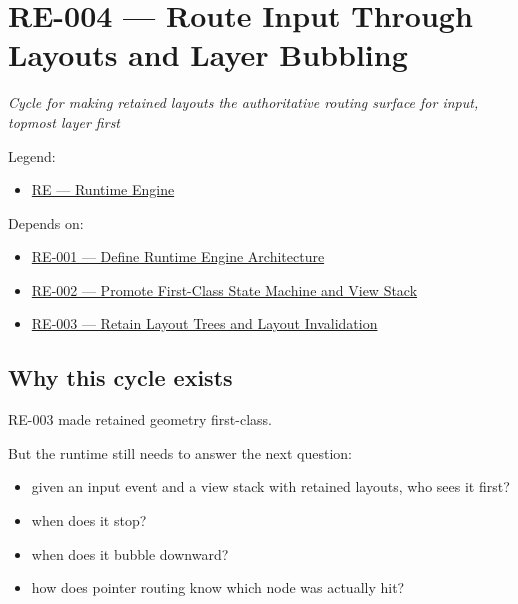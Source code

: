 \chapter{RE-004 --- Route Input Through Layouts and Layer Bubbling}\label{record-152}

\smallskip

\emph{Cycle for making retained layouts the authoritative routing surface for input, topmost layer first}

Legend:

\begin{itemize}
\tightlist
\item
  \href{https://github.com/flyingrobots/bijou/blob/1853ad902f6bf219326409e7f743a5a1d6517dbc/docs/legends/RE-runtime-engine.md}{RE --- Runtime Engine}
\end{itemize}

Depends on:

\begin{itemize}
\tightlist
\item
  \href{https://github.com/flyingrobots/bijou/blob/cbd70612140e7a450d764b3c7be1c6af878b99bc/docs/design/RE-001-define-runtime-engine-architecture.md}{RE-001 --- Define Runtime Engine Architecture}
\item
  \href{https://github.com/flyingrobots/bijou/blob/cbd70612140e7a450d764b3c7be1c6af878b99bc/docs/design/RE-002-promote-first-class-state-machine-and-view-stack.md}{RE-002 --- Promote First-Class State Machine and View Stack}
\item
  \href{https://github.com/flyingrobots/bijou/blob/cbd70612140e7a450d764b3c7be1c6af878b99bc/docs/design/RE-003-retain-layout-trees-and-layout-invalidation.md}{RE-003 --- Retain Layout Trees and Layout Invalidation}
\end{itemize}

\section{Why this cycle exists}\label{record-152-why-this-cycle-exists}

RE-003 made retained geometry first-class.

But the runtime still needs to answer the next question:

\begin{itemize}
\tightlist
\item
  given an input event and a view stack with retained layouts, who sees it first?
\item
  when does it stop?
\item
  when does it bubble downward?
\item
  how does pointer routing know which node was actually hit?
\end{itemize}


